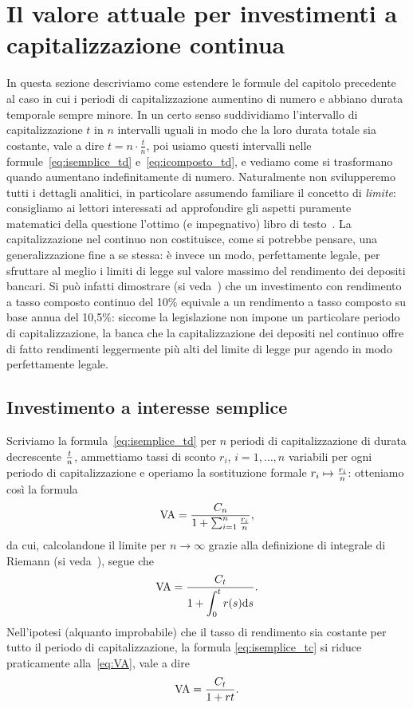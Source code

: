 \section[Capitalizzazione continua]{Il valore attuale per investimenti a capitalizzazione continua}
\label{sec:tcontinui}
In questa sezione descriviamo come estendere le formule del capitolo precedente al caso in cui i periodi di capitalizzazione
aumentino di numero e abbiano durata temporale sempre minore. In un certo senso suddividiamo l'intervallo di capitalizzazione
$t$ in $n$ intervalli uguali in modo che la loro durata totale sia costante, vale a dire $ t=n\cdot\frac{t}{n}$, poi usiamo
questi intervalli nelle formule~\eqref{eq:isemplice_td} e~\eqref{eq:icomposto_td}, e vediamo come si trasformano quando aumentano
indefinitamente di numero. Naturalmente non svilupperemo tutti i dettagli analitici, in particolare assumendo familiare il concetto
di \emph{limite}: consigliamo ai lettori interessati ad approfondire gli aspetti puramente matematici della questione l'ottimo
(e impegnativo) libro di testo~\cite{Fischer1983}.\newline
La capitalizzazione nel continuo non costituisce, come si potrebbe pensare, una generalizzazione fine a se stessa: è invece
un modo, perfettamente legale, per sfruttare al meglio i limiti di legge sul valore massimo del rendimento dei depositi bancari.
Si può infatti dimostrare (si veda~\cite[§3.3.1, p. 45, esempio 1]{brealey_et_al1999}) che un investimento con rendimento
a tasso composto continuo del 10\% equivale a un rendimento a tasso composto su base annua del 10,5\%: siccome la legislazione
non impone un particolare periodo di capitalizzazione, la banca che la capitalizzazione dei depositi nel continuo offre di fatto
rendimenti leggermente più alti del limite di legge pur agendo in modo perfettamente legale.


\subsection{Investimento a interesse semplice}
\label{sec:isemplice_tc}

Scriviamo la formula~\eqref{eq:isemplice_td} per $n$ periodi di capitalizzazione di durata decrescente $t\over n$, 
ammettiamo tassi di sconto $r_i$, $i= 1, \ldots, n$ variabili per ogni periodo di capitalizzazione e operiamo la sostituzione
formale $r_i\mapsto {r_i\over n}$: otteniamo così la formula
\[
    \mathrm{VA}=\frac{C_n}{1+\sum_{i=1}^n\frac{r_i}{n}},
\]
da cui, calcolandone il limite per $n\to \infty$ grazie alla definizione di integrale di Riemann
(si veda~\cite[chapter , §.4, pp.~629--638]{Fischer1983}), segue che
\begin{equation}
  \label{eq:isemplice_tc}
  \mathrm{VA}=\frac{C_t}{\displaystyle{1+\int_{0}^tr(s)\mathrm{d}s}}.
\end{equation}
Nell'ipotesi (alquanto improbabile) che il tasso di rendimento sia costante per tutto il periodo di capitalizzazione,
la formula \eqref{eq:isemplice_tc} si riduce praticamente alla~\eqref{eq:VA}, vale a dire
\[
  \mathrm{VA}=\frac{C_t}{1+rt}.
\]

